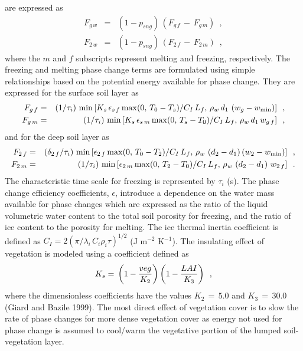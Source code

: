 are expressed as
%
\begin{eqnarray}
F_{g\,w} &=& \left(1-p_{sng}\right)\,\left( F_{g\,f}
\,-\, F_{g\,m}\right)\,\,\,, \\
%
F_{2\,w} &=& \left(1-p_{sng}\right)\,\left( F_{2\,f}
\,-\, F_{2\,m}\right)\,\,\,,
\end{eqnarray}
%
where the $m$ and $f$ subscripts represent melting and
freezing, respectively.
The freezing and melting phase change terms are formulated using simple
relationships based on the potential
energy available for phase change. They are expressed
for the surface soil layer as
%
\begin{eqnarray}
F_{g\,f} &=& \left(1/\tau_i \right)\,{\rm min} \left[
K_s \,\epsilon_{s\,f} \,{\rm max}(0,\,T_0-T_s)/C_I \, L_f ,\,
\rho_w\,d_1\,\left( w_g-w_{\rm min} \right)
\right]
\,\,\, , \\
%
F_{g\,m} &=& \left(1/\tau_i \right)\,{\rm min} \left[
K_s \,\epsilon_{s\,m} \,{\rm max}(0,\,T_s-T_0)/C_I \, L_f ,\,
\rho_w\,d_1\,w_{g\,f}
\right]
\,\,\, ,
\end{eqnarray}
%
and for the deep soil layer as
%
\begin{eqnarray}
F_{2\,f} &=& \left(\delta_{2\,f}/\tau_i \right)\,{\rm min} \left[
\epsilon_{2\,f} \,{\rm max}(0,\,T_0-T_2)/C_I \, L_f , \,
\rho_w\,\left(d_2-d_1\right)\left( w_2-w_{\rm min}\right)\right]
\,\,\, ,\\
%
F_{2\,m} &=& \left(1/\tau_i \right)\,{\rm min} \left[
\epsilon_{2\,m} \,{\rm max}(0,\,T_2-T_0)/C_I \, L_f , \,
\rho_w\,\left(d_2-d_1\right)\,w_{2\,f}\right]
\,\,\,.
\end{eqnarray}
%
The characteristic time scale for freezing is represented by $\tau_i$ (s).
The phase change efficiency coefficients, $\epsilon$, introduce
a dependence on the water mass available for phase changes
which are expressed as
the ratio of the liquid volumetric water content
to the total soil porosity for freezing,
and the ratio of ice content to the porosity for melting.
The ice thermal inertia coefficient is defined as
$C_I = 2 {\left( {\pi/\lambda_i\,C_i\rho_i\tau} \right)}^{1/2}$
(J m$^{-2}$ K$^{-1}$).
The insulating effect of vegetation is modeled using a coefficient
defined as
%
\begin{eqnarray}
K_s =
\, \left({1-{veg\over K_2}}\right)
\left({1-{LAI\over K_3}}\right) \,\,\,,
\end{eqnarray}
%
where the dimensionless coefficients have
the values $K_2\,=\,5.0$ and $K_3\,=\,30.0$ (Giard and Bazile 1999).
The most direct
effect of vegetation cover
is to slow the rate of phase changes for more dense vegetation cover
as energy not used for phase change is assumed to cool/warm the
vegetative portion of the lumped soil-vegetation layer.

